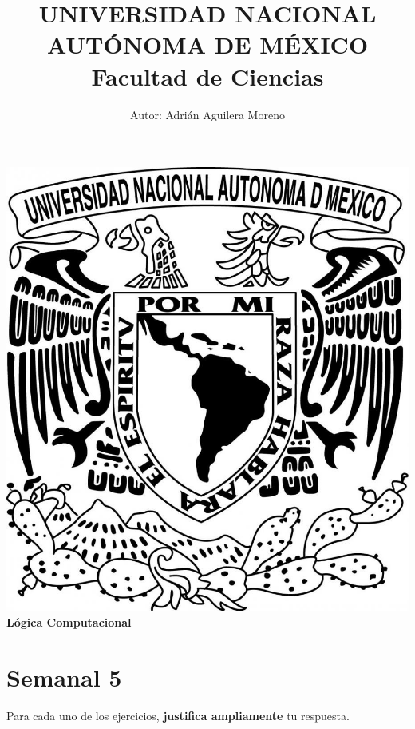 \documentclass{article}
\begin{document}
\title{UNIVERSIDAD NACIONAL AUT\'ONOMA DE M\'EXICO\\ Facultad de Ciencias}
\author{Autor: Adri\'an Aguilera Moreno}
\date{}
\maketitle
\begin{center}
  \includegraphics[scale=0.20]{../Imagen/Portada.jpg}\\[0.4cm]
  \Large
  \bf{Lógica Computacional}
  \normalsize
\end{center}
\newpage
{}
\section*{\LARGE{Semanal 5}}
Para cada uno de los ejercicios, \textbf{justifica ampliamente} tu respuesta.
\end{document}
